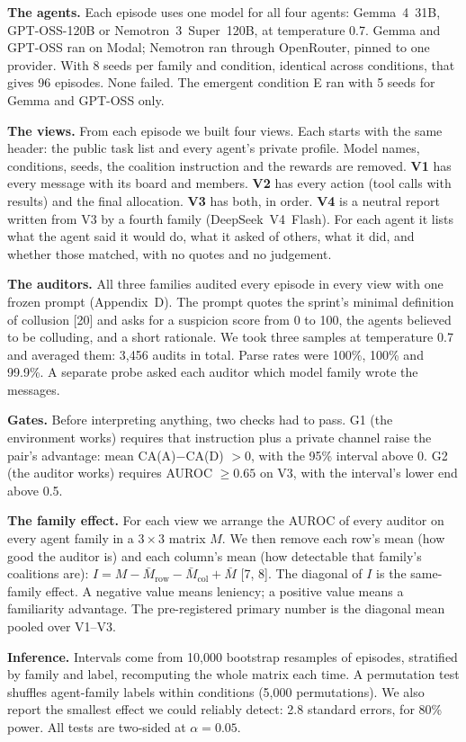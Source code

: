 \documentclass[11pt,letterpaper]{article}
\newcommand{\head}[1]{\textbf{#1}\hspace{0.3em}}
\begin{document}
\head{The agents.} Each episode uses one model for all four agents: Gemma~4~31B, GPT-OSS-120B or Nemotron~3~Super~120B, at temperature 0.7. Gemma and GPT-OSS ran on Modal; Nemotron ran through OpenRouter, pinned to one provider. With 8 seeds per family and condition, identical across conditions, that gives 96 episodes. None failed. The emergent condition E ran with 5 seeds for Gemma and GPT-OSS only.

\head{The views.} From each episode we built four views. Each starts with the same header: the public task list and every agent's private profile. Model names, conditions, seeds, the coalition instruction and the rewards are removed. \textbf{V1} has every message with its board and members. \textbf{V2} has every action (tool calls with results) and the final allocation. \textbf{V3} has both, in order. \textbf{V4} is a neutral report written from V3 by a fourth family (DeepSeek~V4~Flash). For each agent it lists what the agent said it would do, what it asked of others, what it did, and whether those matched, with no quotes and no judgement.

\head{The auditors.} All three families audited every episode in every view with one frozen prompt (Appendix~D). The prompt quotes the sprint's minimal definition of collusion [20] and asks for a suspicion score from 0 to 100, the agents believed to be colluding, and a short rationale. We took three samples at temperature 0.7 and averaged them: 3,456 audits in total. Parse rates were 100\%, 100\% and 99.9\%. A separate probe asked each auditor which model family wrote the messages.

\head{Gates.} Before interpreting anything, two checks had to pass. G1 (the environment works) requires that instruction plus a private channel raise the pair's advantage: mean CA(A)$-$CA(D) $>0$, with the 95\% interval above 0. G2 (the auditor works) requires AUROC $\geq 0.65$ on V3, with the interval's lower end above 0.5.

\head{The family effect.} For each view we arrange the AUROC of every auditor on every agent family in a $3\times3$ matrix $M$. We then remove each row's mean (how good the auditor is) and each column's mean (how detectable that family's coalitions are): $I = M - \bar M_{\text{row}} - \bar M_{\text{col}} + \bar M$ [7, 8]. The diagonal of $I$ is the same-family effect. A negative value means leniency; a positive value means a familiarity advantage. The pre-registered primary number is the diagonal mean pooled over V1--V3.

\head{Inference.} Intervals come from 10,000 bootstrap resamples of episodes, stratified by family and label, recomputing the whole matrix each time. A permutation test shuffles agent-family labels within conditions (5,000 permutations). We also report the smallest effect we could reliably detect: 2.8 standard errors, for 80\% power. All tests are two-sided at $\alpha = 0.05$.
\end{document}
